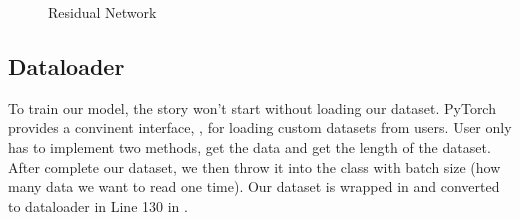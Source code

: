 \documentclass[12pt,a4paper]{article}
\begin{document}
\begin{figure}[hbt]
\centering
{}
\caption{Residual Network}
\label{fig:resnet}
\end{figure}

\subsection{Dataloader}
To train our model, the story won't start without loading our dataset. PyTorch provides a convinent interface, , for loading custom datasets from users. User only has to implement two methods, get the data and get the length of the dataset. After complete our dataset, we then throw it into the  class with batch size (how many data we want to read one time). Our dataset is wrapped in  and converted to dataloader in Line 130 in .
\end{document}
